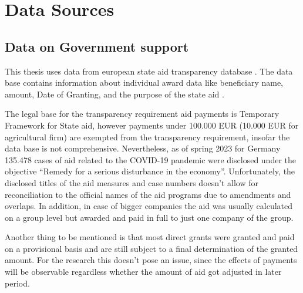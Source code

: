 
\chapter{Data Sources} %

\label{Chapter3} %


\section{Data on Government support}

This thesis uses data from european state aid transparency database \parencite{eu_com_state_2023}. 
The data base contains information about individual award data like beneficiary name, amount, Date of Granting, and the purpose of the state aid \parencite{eu_com_state_2023}. 

The legal base for the transparency requirement aid payments is Temporary Framework for State aid, however payments under 100.000 EUR (10.000 EUR for agricultural firm) are exempted from the transparency requirement, insofar the data base is not comprehensive. Nevertheless, as of spring 2023 for Germany 135.478 cases of aid related to the COVID-19 pandemic were disclosed under the objective “Remedy for a serious disturbance in the economy”. Unfortunately, the disclosed titles of the aid measures and case numbers doesn't allow for reconciliation to the official names of the aid programs due to amendments and overlaps. In addition, in case of bigger companies the aid was usually calculated on a group level but awarded and paid in full to just one company of the group. 

Another thing to be mentioned is that most direct grants were granted and paid on a provisional basis and are still subject to a final determination of the granted amount. For the research this doesn't pose an issue, since the effects of payments will be observable regardless whether the amount of aid got adjusted in later period. 






